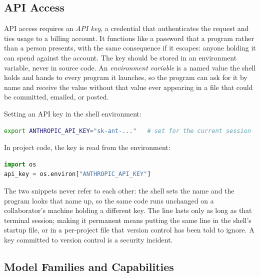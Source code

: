 \subsection{API Access}

API access requires an \emph{API key}, a credential that authenticates the request and ties usage to a billing account.
It functions like a password that a program rather than a person presents, with the same consequence if it escapes: anyone holding it can spend against the account.
The key should be stored in an environment variable, never in source code.
An \emph{environment variable} is a named value the shell holds and hands to every program it launches, so the program can ask for it by name and receive the value without that value ever appearing in a file that could be committed, emailed, or posted.

\begin{example}
Setting an API key in the shell environment:
\begin{lstlisting}[language=bash]
export ANTHROPIC_API_KEY="sk-ant-..."   # set for the current session
\end{lstlisting}
In project code, the key is read from the environment:
\begin{lstlisting}[language=python]
import os
api_key = os.environ["ANTHROPIC_API_KEY"]
\end{lstlisting}
The two snippets never refer to each other: the shell sets the name  and the program looks that name up, so the same code runs unchanged on a collaborator's machine holding a different key.
The  line lasts only as long as that terminal session; making it permanent means putting the same line in the shell's startup file, or in a per-project file that version control has been told to ignore.
A key committed to version control is a security incident.
\end{example}

\subsection{Model Families and Capabilities}

